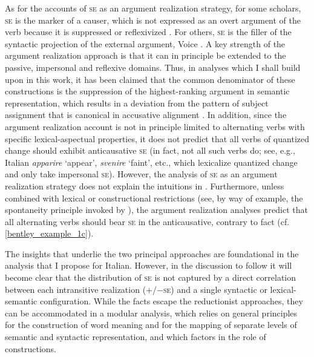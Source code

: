 \documentclass[output=paper,colorlinks,citecolor=brown
]{langscibook}
\begin{document}
\begin{sloppypar}
As for the accounts of \textsc{se} as an argument realization strategy, for some scholars, \textsc{se} is the marker of a causer, which is not expressed as an overt argument of the verb because it is suppressed or reflexivized \citep{rothemerg1974verbes,vanvalin1990semantic,labelle1992change,cennamo1995patterns,centineo1995distribution,bentley2006split,koontz2009anticausativization}. For others, \textsc{se} is the filler of the syntactic projection of the external argument, Voice \citep{alexiadou2006properties,alexiadou2015external}. A key strength of the argument realization approach is that it can in principle be extended to the passive, impersonal and reflexive domains. Thus, in analyses which I shall build upon in this work, it has been claimed that the common denominator of these constructions is the suppression of the highest-ranking argument in semantic representation, which results in a deviation from the pattern of subject assignment that is canonical in accusative alignment \citep{vanvalin1990semantic,centineo1995distribution,bentley2006split,bentley2023internally,gonzales2006construcciones}. In addition, since the argument realization account is not in principle limited to alternating verbs with specific lexical-aspectual properties, it does not predict that all verbs of quantized change should exhibit anticausative \textsc{se} (in fact, not all such verbs do; see, e.g., Italian \textit{apparire} ‘appear’, \textit{svenire} ‘faint’, etc., which lexicalize quantized change and only take impersonal \textsc{se}). However, the analysis of \textsc{se} as an argument realization strategy does not explain the intuitions in . Furthermore, unless combined with lexical or constructional restrictions (see, by way of example, the spontaneity principle invoked by \cite[96, 114--120]{alexiadou2015external}), the argument realization analyses predict that all alternating verbs should bear \textsc{se} in the anticausative, contrary to fact (cf. \ref{bentley_example_1c}). 
\end{sloppypar}

The insights that underlie the two principal approaches are foundational in the analysis that I propose for Italian. However, in the discussion to follow it will become clear that the distribution of \textsc{se} is not captured by a direct correlation between each intransitive realization (+/−\textsc{se}) and a single syntactic or lexical-semantic configuration. While the facts escape the reductionist approaches, they can be accommodated in a modular analysis, which relies on general principles for the construction of word meaning and for the mapping of separate levels of semantic and syntactic representation, and which factors in the role of constructions. 
\end{document}
